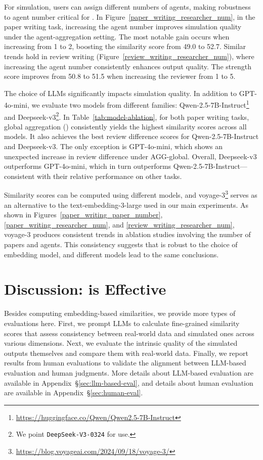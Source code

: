 For \envname simulation, users can assign different numbers of agents, making robustness to agent number critical for \envname. In Figure~\ref{paper_writing_researcher_num}, in the paper writing task, increasing the agent number improves simulation quality under the agent-aggregation setting. The most notable gain occurs when increasing from 1 to 2, boosting the similarity score from 49.0 to 52.7.
Similar trends hold in review writing (Figure~\ref{review_writing_researcher_num}), where increasing the agent number consistently enhances output quality. The strength score improves from 50.8 to 51.5 when increasing the reviewer from 1 to 5.



 The choice of LLMs significantly impacts simulation quality. In addition to GPT-4o-mini, we evaluate two models from different families: Qwen-2.5-7B-Instruct\footnote{\url{https://huggingface.co/Qwen/Qwen2.5-7B-Instruct}} and Deepseek-v3\footnote{We point \texttt{DeepSeek-V3-0324} for use.}. In Table~\ref{tab:model-ablation}, for both paper writing tasks, global aggregation (\envname) consistently yields the highest similarity scores across all models. It also achieves the best review difference scores for Qwen-2.5-7B-Instruct and Deepseek-v3. The only exception is GPT-4o-mini, which shows an unexpected increase in review difference under AGG-global. Overall, Deepseek-v3 outperforms GPT-4o-mini, which in turn outperforms Qwen-2.5-7B-Instruct—consistent with their relative performance on other tasks.

 Similarity scores can be computed using different models, and voyage-3\footnote{\url{https://blog.voyageai.com/2024/09/18/voyage-3/}} serves as an alternative to the text-embedding-3-large used in our main experiments. As shown in Figures~\ref{paper_writing_paper_number}, \ref{paper_writing_researcher_num}, and \ref{review_writing_researcher_num}, voyage-3 produces consistent trends in ablation studies involving the number of papers and agents. This consistency suggests that \envname is robust to the choice of embedding model, and different models lead to the same conclusions.



\vspace{-1mm}
\section{Discussion: \envname is Effective}
Besides computing embedding-based similarities, we provide more types of evaluations here. First, we prompt LLMs to calculate fine-grained similarity scores that assess consistency between real-world data and simulated ones across various dimensions. Next, we evaluate the intrinsic quality of the simulated outputs themselves and compare them with real-world data. Finally, we report results from human evaluations to validate the alignment between LLM-based evaluation and human judgments. More details about LLM-based evaluation are available in Appendix~\S\ref{sec:llm-based-eval}, and details about human evaluation are available in Appendix~\S\ref{sec:human-eval}.

